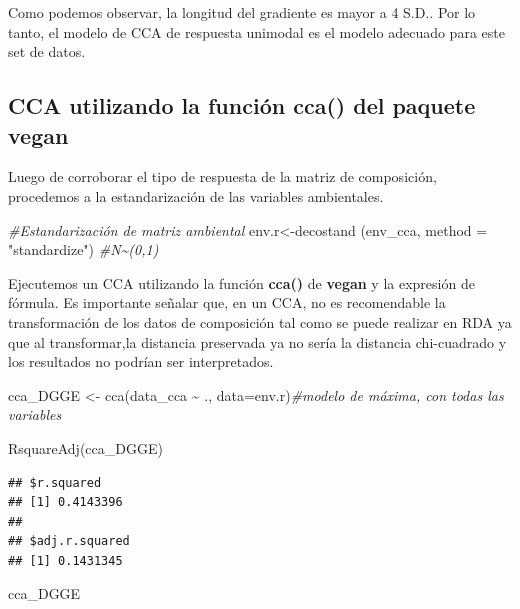 \documentclass[
]{book}
\newenvironment{Shaded}{\begin{snugshade}}{\end{snugshade}}
\newcommand{\AttributeTok}[1]{\textcolor[rgb]{0.77,0.63,0.00}{#1}}
\newcommand{\CommentTok}[1]{\textcolor[rgb]{0.56,0.35,0.01}{\textit{#1}}}
\newcommand{\FunctionTok}[1]{\textcolor[rgb]{0.00,0.00,0.00}{#1}}
\newcommand{\NormalTok}[1]{#1}
\newcommand{\OtherTok}[1]{\textcolor[rgb]{0.56,0.35,0.01}{#1}}
\newcommand{\SpecialCharTok}[1]{\textcolor[rgb]{0.00,0.00,0.00}{#1}}
\newcommand{\StringTok}[1]{\textcolor[rgb]{0.31,0.60,0.02}{#1}}
\begin{document}
Como podemos observar, la longitud del gradiente es mayor a 4 S.D.. Por lo tanto, el modelo de CCA de respuesta unimodal es el modelo adecuado para este set de datos.

\hypertarget{cca-utilizando-la-funciuxf3n-cca-del-paquete-vegan}{%
\subsection{\texorpdfstring{CCA utilizando la función \textbf{cca()} del paquete \textbf{vegan}}{CCA utilizando la función cca() del paquete vegan}}\label{cca-utilizando-la-funciuxf3n-cca-del-paquete-vegan}}

Luego de corroborar el tipo de respuesta de la matriz de composición, procedemos a la estandarización de las variables ambientales.

\begin{Shaded}
\begin{Highlighting}[]
\CommentTok{\#Estandarización de matriz ambiental}
\NormalTok{env.r}\OtherTok{\textless{}{-}}\FunctionTok{decostand}\NormalTok{ (env\_cca, }\AttributeTok{method =} \StringTok{"standardize"}\NormalTok{) }\CommentTok{\#N\textasciitilde{}(0,1)}
\end{Highlighting}
\end{Shaded}

Ejecutemos un CCA utilizando la función \textbf{cca()} de \textbf{vegan} y la expresión de fórmula. Es importante señalar que, en un CCA, no es recomendable la transformación de los datos de composición tal como se puede realizar en RDA ya que al transformar,la distancia preservada ya no sería la distancia chi-cuadrado y los resultados no podrían ser interpretados.

\begin{Shaded}
\begin{Highlighting}[]
\NormalTok{cca\_DGGE }\OtherTok{\textless{}{-}} \FunctionTok{cca}\NormalTok{(data\_cca }\SpecialCharTok{\textasciitilde{}}\NormalTok{ ., }\AttributeTok{data=}\NormalTok{env.r)}\CommentTok{\#modelo de máxima, con todas las variables}

\FunctionTok{RsquareAdj}\NormalTok{(cca\_DGGE) }
\end{Highlighting}
\end{Shaded}

\begin{verbatim}
## $r.squared
## [1] 0.4143396
## 
## $adj.r.squared
## [1] 0.1431345
\end{verbatim}

\begin{Shaded}
\begin{Highlighting}[]
\NormalTok{cca\_DGGE}
\end{Highlighting}
\end{Shaded}
\end{document}
